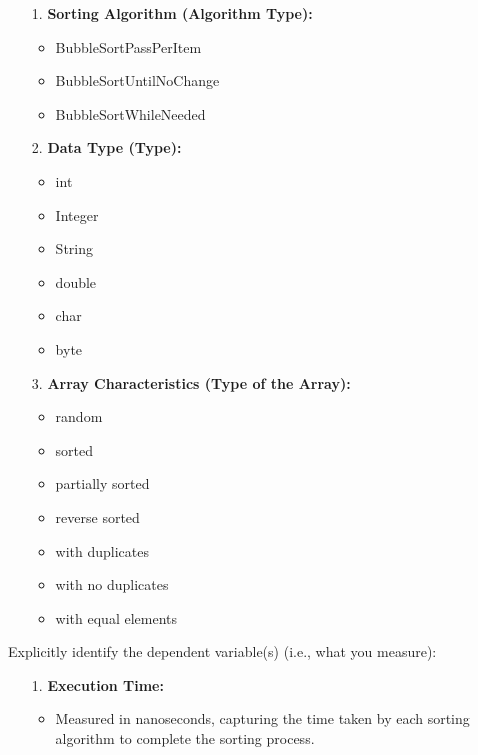 \documentclass{article}
\begin{document}
    \begin{tcolorbox}[title=Independent Variable:, colback=white, colframe=black, arc=0pt, outer arc=0pt]
        \begin{itemize}
         \item[1.] \textbf{Sorting Algorithm (Algorithm Type):}
            \begin{itemize}
            \item BubbleSortPassPerItem
            \item BubbleSortUntilNoChange
            \item BubbleSortWhileNeeded
            \end{itemize}
        \item[2.] \textbf{Data Type (Type):}
            \begin{itemize}
            \item int
            \item Integer
            \item String
            \item double
            \item char
            \item byte
            \end{itemize}
        \item[3.] \textbf{Array Characteristics (Type of the Array):}
            \begin{itemize}
            \item random
            \item sorted
            \item partially sorted
            \item reverse sorted
            \item with duplicates
            \item with no duplicates
            \item with equal elements
            \end{itemize}
        \end{itemize}

    \end{tcolorbox}
Explicitly identify the dependent variable(s) (i.e., what you measure):\\

\begin{tcolorbox}[title=Dependent Variable:, colback=white, colframe=black, arc=0pt, outer arc=0pt]
    \begin{itemize}
        \item[1.] \textbf{Execution Time:}
        \begin{itemize}
            \item Measured in nanoseconds, capturing the time taken by each sorting algorithm to complete the sorting process.
        \end{itemize}
    \end{itemize}
\end{tcolorbox}
\end{document}
